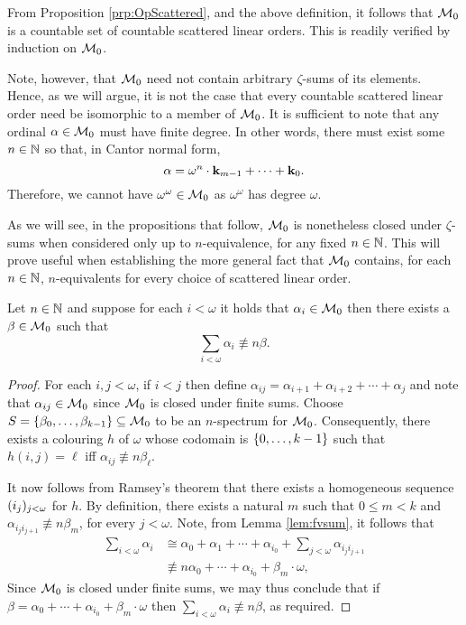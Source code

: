 From Proposition \ref{prp:OpScattered}, and the above definition, it follows
that $\mathcal{M}_0$ is a countable set of countable scattered linear orders.  This is
readily verified by induction on $\mathcal{M}_0$.

Note, however, that $\mathcal{M}_0$ need not contain arbitrary $\zeta$-sums of its
elements.  Hence, as we will argue, it is not the case that every countable
scattered linear order need be isomorphic to a member of $\mathcal{M}_0$.  It is
sufficient to note that any ordinal $\alpha\in\mathcal{M}_0$ must have finite degree.
In other words, there must exist some $n\in\mathbb{N}$ so that, in Cantor normal
form,
\begin{equation}
	\alpha=\omega^n\cdot\mathbf{k}_{m-1}+\dotsb+\mathbf{k}_0.
\end{equation}
Therefore, we cannot have $\omega^\omega\in\mathcal{M}_0$ as $\omega^\omega$ has degree
$\omega$.

As we will see, in the propositions that follow, $\mathcal{M}_0$ is nonetheless closed
under $\zeta$-sums when considered only up to $n$-equivalence, for any fixed
$n\in\mathbb{N}$.  This will prove useful when establishing the more general fact
that $\mathcal{M}_0$ contains, for each $n\in\mathbb{N}$, $n$-equivalents for every choice
of scattered linear order.

\begin{prp}\label{prp:M0sum}
	Let $n\in\mathbb{N}$ and suppose for each $i<\omega$ it holds that $\alpha_i\in\mathcal{M}_0$ then there exists a $\beta\in\mathcal{M}_0$ such that
	\begin{equation}
		\sum_{i<\omega}\alpha_i\nequiv{n}\beta.
	\end{equation}
\end{prp}
\begin{proof}
	For each $i,j<\omega$, if $i<j$ then define $\alpha_{ij}=\alpha_{i+1}+\alpha_{i+2}+\dotsb+\alpha_j$ and note that $\alpha_{ij}\in\mathcal{M}_0$ since $\mathcal{M}_0$ is closed under finite sums.  Choose $S=\left\lbrace \beta_0,\dotsc,\beta_{k-1}\right\rbrace\subseteq\mathcal{M}_0$ to be an $n$-spectrum for $\mathcal{M}_0$.  Consequently, there exists a colouring $h$ of $\omega$ whose codomain is $\left\lbrace 0,\dotsc,k-1\right\rbrace$ such that $h(i,j)=\ell$ iff $\alpha_{ij}\nequiv{n}\beta_\ell$.

	It now follows from Ramsey's theorem that there exists a homogeneous sequence $(i_j)_{j<\omega}$ for $h$.  By definition, there exists a natural $m$ such that $0\leq m<k$ and $\alpha_{i_ji_{j+1}}\nequiv{n}\beta_m$, for every $j<\omega$.  Note, from Lemma \ref{lem:fvsum}, it follows that
	\begin{align}
		\sum_{i<\omega}\alpha_i&\cong\alpha_0+\alpha_1+\dotsb+\alpha_{i_0}+\sum_{j<\omega}\alpha_{i_ji_{j+1}}\\
		&\nequiv{n}\alpha_0+\dotsb+\alpha_{i_0}+\beta_m\cdot\omega,
	\end{align}
	Since $\mathcal{M}_0$ is closed under finite sums, we may thus conclude that if $\beta=\alpha_0+\dotsb+\alpha_{i_0}+\beta_m\cdot\omega$ then $\sum_{i<\omega}\alpha_i\nequiv{n}\beta$, as required.
\end{proof}

